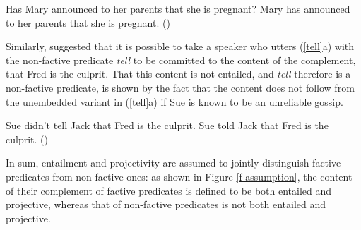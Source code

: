 \documentclass[11pt,fleqn]{article}
\newcommand{\6}{\mbox{$[\hspace*{-.6mm}[$}}
\newcommand{\9}{\mbox{$]\hspace*{-.6mm}]$}}
\begin{document}
\begin{exe}
\ex\label{announce2} 
\begin{xlist}
\ex Has Mary announced to her parents that she is pregnant? 
\ex Mary has announced to her parents that she is pregnant. \hfill (\citealt[139]{schlenker10})
\end{xlist}
\end{exe}
Similarly, \citet{spector-egre2015} suggested that it is possible to take a speaker who utters (\ref{tell}a) with the non-factive predicate {\em tell}  to be committed to the content of the complement, that Fred is the culprit. That this content is not entailed, and {\em tell} therefore is a non-factive predicate, is shown by the fact that the content does not follow from the unembedded variant in (\ref{tell}a) if Sue is known to be an unreliable gossip.

\begin{exe}
\ex\label{tell}
\begin{xlist}
\ex Sue didn't tell Jack that Fred is the culprit. 
\ex Sue told Jack that Fred is the culprit. \hfill (\citealt[1739]{spector-egre2015})
\end{xlist}
\end{exe}

In sum, entailment and projectivity are assumed to jointly distinguish factive predicates from non-factive ones: as shown in Figure \ref{f-assumption}, the content of their complement of factive predicates is defined to be both entailed and projective, whereas that of non-factive predicates is not both entailed and projective. 
\end{document}
